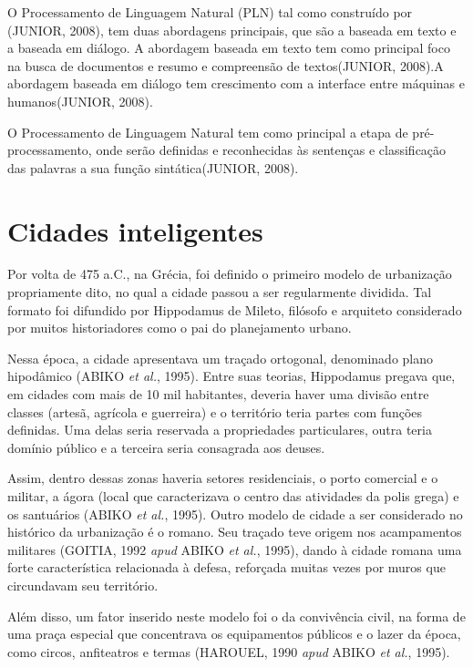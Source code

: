 O Processamento de Linguagem Natural (PLN) tal como construído por (JUNIOR, 2008), tem duas abordagens principais, que são a baseada em texto e a baseada em diálogo. A abordagem baseada em texto tem como principal foco na busca de documentos e resumo e compreensão de textos(JUNIOR, 2008).A abordagem baseada em diálogo tem crescimento com a interface entre máquinas e humanos(JUNIOR, 2008). 

O Processamento de Linguagem Natural tem como principal a etapa de pré-processamento, onde serão definidas e reconhecidas às sentenças e classificação das palavras a sua função sintática(JUNIOR, 2008).

\section{Cidades inteligentes} \label{s:cidades_inteligentes}

Por volta de 475 a.C., na Grécia, foi definido o primeiro modelo de urbanização propriamente dito, no qual a cidade passou a ser regularmente dividida. Tal formato foi difundido por Hippodamus de Mileto, filósofo e arquiteto considerado por muitos historiadores como o pai do planejamento urbano.

Nessa época, a cidade apresentava um traçado ortogonal, denominado plano hipodâmico (ABIKO \textit{et al.}, 1995). Entre suas teorias, Hippodamus pregava que, em cidades com mais de 10 mil habitantes, deveria haver uma divisão entre classes (artesã, agrícola e guerreira) e o território teria partes com funções definidas. Uma delas seria reservada a propriedades particulares, outra teria domínio público e a terceira seria consagrada aos deuses.

Assim, dentro dessas zonas haveria setores residenciais, o porto comercial e o militar, a ágora (local que caracterizava o centro das atividades da polis grega) e os santuários (ABIKO \textit{et al.}, 1995).
Outro modelo de cidade a ser considerado no histórico da urbanização é o romano. Seu traçado teve origem nos acampamentos militares (GOITIA, 1992 \textit{apud} ABIKO \textit{et al.}, 1995), dando à cidade romana uma forte característica relacionada à defesa, reforçada muitas vezes por muros que circundavam seu território.

Além disso, um fator inserido neste modelo foi o da convivência civil, na forma de uma praça especial que concentrava os equipamentos públicos e o lazer da época, como circos, anfiteatros e termas (HAROUEL, 1990 \textit{apud} ABIKO \textit{et al.}, 1995).

